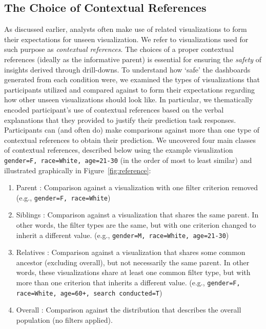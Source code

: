 \subsection{The Choice of Contextual References}
\par As discussed earlier, analysts often make use of related visualizations to form their expectations for unseen visualization. We refer to visualizations used for such purpose as \emph{contextual references}. The choices of a proper contextual references (ideally as the informative parent) is essential for ensuring the \emph{safety} of insights derived through drill-downs. To understand how `safe' the dashboards generated from each condition were, we examined the types of visualizations that participants utilized and compared against to form their expectations regarding how other unseen visualizations should look like. In particular, we thematically encoded participant's use of contextual references based on the verbal explanations that they provided to justify their prediction task responses. Participants can (and often do) make comparisons against more than one type of contextual references to obtain their prediction. We uncovered four main classes of contextual references, described below using the example visualization \texttt{gender=F, race=White, age=21-30} (in the order of most to least similar) and illustrated graphically in Figure~\ref{fig:reference}:
\begin{enumerate}
	\item Parent : Comparison against a visualization with one filter criterion removed (e.g., \texttt{gender=F, race=White})
	\item Siblings : Comparison against a visualization that shares the same parent. In other words, the filter types are the same, but with one criterion changed to inherit a different value. (e.g., \texttt{gender=M, race=White, age=21-30})
	\item Relatives : Comparison against a visualization that shares some common ancestor (excluding overall), but not necessarily the same parent. In other words, these visualizations share at least one common filter type, but with more than one criterion that inherits a different value. (e.g., \texttt{gender=F, race=White, age=60+, search conducted=T})
	\item Overall : Comparison against the distribution that describes the overall population (no filters applied).
\end{enumerate}
